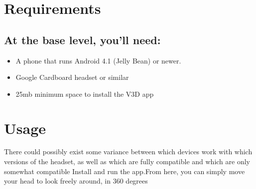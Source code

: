 \documentclass[english]{article}
\begin{document}

\tableofcontents
\newpage

\section{Requirements}
    \subsection{At the base level, you’ll need:}
        
        \begin{itemize}
            \item A phone that runs Android 4.1 (Jelly Bean) or newer.
    
            \item Google Cardboard headset or similar
    
            \item 25mb minimum space to install the V3D app 
        \end{itemize}

\section{Usage} 
There could possibly exist some variance between which devices work with which versions of the headset, as well as which are fully compatible and which are only somewhat compatible \newline
\newline
Install and run the app.\newline From here, you can simply move your head to look freely around, in 360 degrees
\end{document}
